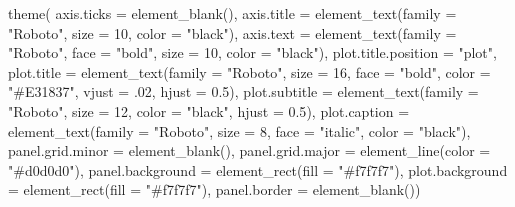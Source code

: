 \documentclass[
  letterpaper,
]{krantz}
\newenvironment{Shaded}{\begin{snugshade}}{\end{snugshade}}
\newcommand{\AttributeTok}[1]{\textcolor[rgb]{0.40,0.45,0.13}{#1}}
\newcommand{\DecValTok}[1]{\textcolor[rgb]{0.68,0.00,0.00}{#1}}
\newcommand{\FloatTok}[1]{\textcolor[rgb]{0.68,0.00,0.00}{#1}}
\newcommand{\FunctionTok}[1]{\textcolor[rgb]{0.28,0.35,0.67}{#1}}
\newcommand{\NormalTok}[1]{\textcolor[rgb]{0.00,0.23,0.31}{#1}}
\newcommand{\StringTok}[1]{\textcolor[rgb]{0.13,0.47,0.30}{#1}}
\begin{document}
\begin{Shaded}
\begin{Highlighting}[]
  \FunctionTok{theme}\NormalTok{(}
    \AttributeTok{axis.ticks =} \FunctionTok{element\_blank}\NormalTok{(),}
    \AttributeTok{axis.title =} \FunctionTok{element\_text}\NormalTok{(}\AttributeTok{family =} \StringTok{"Roboto"}\NormalTok{,}
                              \AttributeTok{size =} \DecValTok{10}\NormalTok{, }
                              \AttributeTok{color =} \StringTok{"black"}\NormalTok{),}
    \AttributeTok{axis.text =} \FunctionTok{element\_text}\NormalTok{(}\AttributeTok{family =} \StringTok{"Roboto"}\NormalTok{,}
                             \AttributeTok{face =} \StringTok{"bold"}\NormalTok{,}
                             \AttributeTok{size =} \DecValTok{10}\NormalTok{,}
                             \AttributeTok{color =} \StringTok{"black"}\NormalTok{),}
    \AttributeTok{plot.title.position =} \StringTok{"plot"}\NormalTok{,}
    \AttributeTok{plot.title =} \FunctionTok{element\_text}\NormalTok{(}\AttributeTok{family =} \StringTok{"Roboto"}\NormalTok{,}
                              \AttributeTok{size =} \DecValTok{16}\NormalTok{,}
                              \AttributeTok{face =} \StringTok{"bold"}\NormalTok{,}
                              \AttributeTok{color =} \StringTok{"\#E31837"}\NormalTok{,}
                              \AttributeTok{vjust =}\NormalTok{ .}\DecValTok{02}\NormalTok{,}
                              \AttributeTok{hjust =} \FloatTok{0.5}\NormalTok{),}
    \AttributeTok{plot.subtitle =} \FunctionTok{element\_text}\NormalTok{(}\AttributeTok{family =} \StringTok{"Roboto"}\NormalTok{,}
                                 \AttributeTok{size =} \DecValTok{12}\NormalTok{,}
                                 \AttributeTok{color =} \StringTok{"black"}\NormalTok{,}
                                 \AttributeTok{hjust =} \FloatTok{0.5}\NormalTok{),}
    \AttributeTok{plot.caption =} \FunctionTok{element\_text}\NormalTok{(}\AttributeTok{family =} \StringTok{"Roboto"}\NormalTok{,}
                                \AttributeTok{size =} \DecValTok{8}\NormalTok{,}
                                \AttributeTok{face =} \StringTok{"italic"}\NormalTok{,}
                                \AttributeTok{color =} \StringTok{"black"}\NormalTok{),}
    \AttributeTok{panel.grid.minor =} \FunctionTok{element\_blank}\NormalTok{(),}
    \AttributeTok{panel.grid.major =}  \FunctionTok{element\_line}\NormalTok{(}\AttributeTok{color =} \StringTok{"\#d0d0d0"}\NormalTok{),}
    \AttributeTok{panel.background =} \FunctionTok{element\_rect}\NormalTok{(}\AttributeTok{fill =} \StringTok{"\#f7f7f7"}\NormalTok{),}
    \AttributeTok{plot.background =} \FunctionTok{element\_rect}\NormalTok{(}\AttributeTok{fill =} \StringTok{"\#f7f7f7"}\NormalTok{),}
    \AttributeTok{panel.border =} \FunctionTok{element\_blank}\NormalTok{())}
\end{Highlighting}
\end{Shaded}
\end{document}
